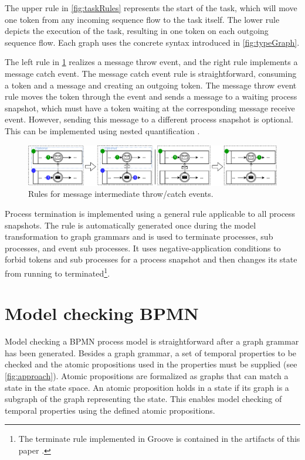 \documentclass[submission, copyright, creativecommons]{eptcs}
\begin{document}
The upper rule in \cref{fig:taskRules} represents the start of the task, which will move one token from any incoming sequence flow to the task itself.
The lower rule depicts the execution of the task, resulting in one token on each outgoing sequence flow.
Each graph uses the concrete syntax introduced in \cref{fig:typeGraph}.

The left rule in \cref{fig:messageEventRules} realizes a message throw event, and the right rule implements a message catch event.
The message catch event rule is straightforward, consuming a token and a message and creating an outgoing token.
The message throw event rule moves the token through the event and sends a message to a waiting process snapshot, which must have a token waiting at the corresponding message receive event.
However, sending this message to a different process snapshot is optional.
This can be implemented using nested quantification \cite{rensinkNestedQuantificationGraph2006}.
\begin{figure}[h]
    \centering
    \includegraphics[width=1\textwidth]{images/bpmn_semantics-message-events.pdf}
    \caption{Rules for message intermediate throw/catch events.}
    \label{fig:messageEventRules}
\end{figure}

Process termination is implemented using a general rule applicable to all process snapshots.
The rule is automatically generated once during the model transformation to graph grammars and is used to terminate processes, sub processes, and event sub processes.
It uses negative-application conditions to forbid tokens and sub processes for a process snapshot and then changes its state from running to terminated\footnote{The terminate rule implemented in Groove is contained in the artifacts of this paper \cite{timkrauterArtifactsTERMGRAPH2022}.}.

\section{Model checking BPMN} \label{sec:modelChecking}

Model checking a BPMN process model is straightforward after a graph grammar has been generated.
Besides a graph grammar, a set of temporal properties to be checked and the atomic propositions used in the properties must be supplied (see \cref{fig:approach}).
Atomic propositions are formalized as graphs that can match a state in the state space.
An atomic proposition holds in a state if its graph is a subgraph of the graph representing the state.
This enables model checking of temporal properties using the defined atomic propositions.
\end{document}

